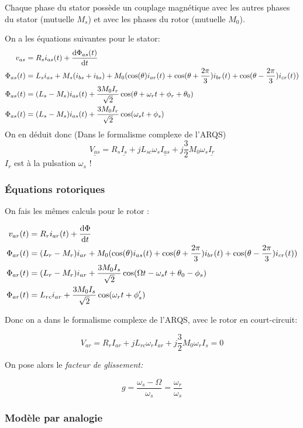 \documentclass[main.tex]{subfiles}
\begin{document}
Chaque phase du stator possède un couplage magnétique avec les autres phases du stator (mutuelle $M_s$) et avec les phases du rotor (mutuelle $M_0$).

On a  les équations suivantes  pour le stator:
\begin{align*}
  v_{as} &= R_s i_{as}(t)+\deriv[\Phi_{as}(t)]{t}\\
  \Phi_{as}(t) &= L_{s} i_{as} + M_s(i_{bs}+i_{bs}) +M_0 (\cos(\theta)i_{ar}(t)+\cos(\theta+\frac{2\pi}{3})i_{br}(t)+\cos(\theta-\frac{2\pi}{3})i_{cr}(t))\\
  \Phi_{as}(t) &= (L_s-M_s) i_{as}(t)+\frac{3M_0I_r}{\sqrt{2}}\cos(\theta+\omega_rt+\phi_r+\theta_0) \\
  \Phi_{as}(t) &= (L_s-M_s) i_{as}(t)+\frac{3M_0I_r}{\sqrt{2}}\cos(\omega_st+\phi_s)
\end{align*}
On en déduit donc (Dans le formalisme complexe de l'ARQS)
\[\boxed{
  \underline{V_{as}} = R_s \underline{I_s}+jL_{sc}\omega_s\underline{I_{as}}+j \frac{3}{2}M_0\omega_s\underline{I_r}
}\]
$I_r$ est à la pulsation $\omega_s$ !

\subsubsection{Équations rotoriques}

On fais les mêmes calculs pour le rotor :

\begin{align*}
  v_{ar}(t) &= R_ri_{ar}(t) + \deriv[\Phi]{t}\\
  \Phi_{ar}(t) &= (L_{r}-M_r) i_{ar} +M_0( \cos(\theta)i_{as}(t)+\cos(\theta+\frac{2\pi}{3})i_{br}(t)+\cos(\theta-\frac{2\pi}{3})i_{cr}(t))\\
  \Phi_{ar}(t) &= (L_{r}-M_r) i_{ar} +\frac{3M_0I_s}{\sqrt{2}} \cos(\Omega t-\omega_st+\theta_0-\phi_s) \\
  \Phi_{ar}(t) &= L_{rc} i_{ar} +\frac{3M_0I_s}{\sqrt{2}} \cos(\omega_rt +\phi_s')
\end{align*}

Donc on a dans le formalisme complexe de l'ARQS, avec le rotor en court-circuit:

\[\boxed{
  V_{ar} = R_rI_{ar}+jL_{rc}\omega_rI_{ar}+j\frac32 M_0\omega_rI_s =0}
\]

On pose alors le \emph{facteur de glissement:}

\[
  \boxed{g= \frac{\omega_s-\Omega}{\omega_s}=\frac{\omega_r}{\omega_s}}
\]


\subsubsection{Modèle par analogie}
\end{document}
